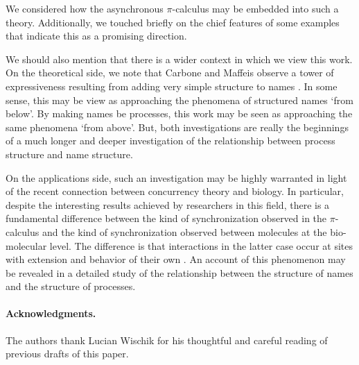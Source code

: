 \documentclass[]{amsart}
\theoremstyle{definition}
\theoremstyle{remark}
\numberwithin{equation}{subsection}
\newcommand{\pic}{$\pi$-calculus}
\begin{document}
We considered how the asynchronous {\pic} may be embedded into such a
theory. Additionally, we touched briefly on the chief features of some
examples that indicate this as a promising direction.

We should also mention that there is a wider context in which we view
this work. On the theoretical side, we note that Carbone and Maffeis
observe a tower of expressiveness resulting from adding very simple
structure to names \cite{polysync}. In some sense, this may be view as
approaching the phenomena of structured names `from below'. By making
names be processes, this work may be seen as approaching the same
phenomena `from above'. But, both investigations are really the
beginnings of a much longer and deeper investigation of the
relationship between process structure and name structure.

On the applications side, such an investigation may be highly
warranted in light of the recent connection between concurrency theory
and biology. In particular, despite the interesting results achieved
by researchers in this field, there is a fundamental difference
between the kind of synchronization observed in the {\pic} and the
kind of synchronization observed between molecules at the
bio-molecular level. The difference is that interactions in the latter
case occur at sites with extension and behavior of their own
\cite{Fontana}. An account of this phenomenon may be revealed in a
detailed study of the relationship between the structure of names and
the structure of processes.

\paragraph{Acknowledgments.}
The authors thank Lucian Wischik for his thoughtful and careful
reading of previous drafts of this paper.





\end{document}
